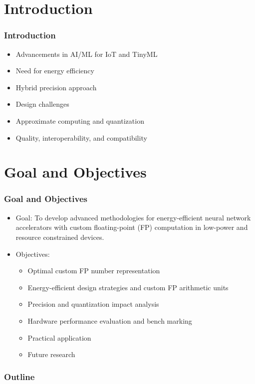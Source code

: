 \section*{Introduction}
	\begin{frame}
		\frametitle{Introduction}
		\begin{itemize}
			\item<1-> Advancements in AI/ML for IoT and TinyML
			\item<2-> Need for energy efficiency
			\item<3-> Hybrid precision approach
			\item<4-> Design challenges
			\item<5-> Approximate computing and quantization
			\item<6-> Quality, interoperability, and compatibility
		\end{itemize}
	\end{frame}
	
	\section*{Goal and Objectives}
	\begin{frame}
		\frametitle{Goal and Objectives}
		\begin{itemize}
			\item<1-> Goal:
			To develop advanced methodologies for energy-efficient neural network accelerators with custom floating-point (FP) computation in low-power and resource constrained devices.
			\item<2-> Objectives:
			\begin{itemize}
				\item<3-> Optimal custom FP number representation
				\item<4-> Energy-efficient design strategies and custom FP arithmetic units
				\item<5-> Precision and quantization impact analysis
				\item<6-> Hardware performance evaluation and bench marking
				\item<7-> Practical application
				\item<8-> Future research
			\end{itemize}
		\end{itemize}
	\end{frame}

	\begin{frame}
	\frametitle{Outline}
	\tableofcontents %
	\end{frame}
	
